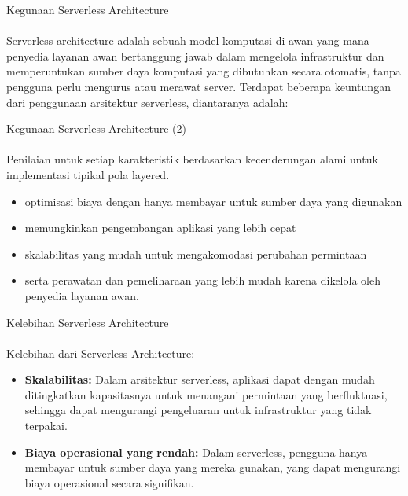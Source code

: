 \documentclass[aspectratio=169, table]{beamer}
\begin{document}
	\begin{frame}{Kegunaan Serverless Architecture}
		\framesubtitle{\hspace{1cm}}
		Serverless architecture adalah sebuah model komputasi di awan yang mana penyedia layanan awan bertanggung jawab dalam mengelola infrastruktur dan memperuntukan sumber daya komputasi yang dibutuhkan secara otomatis, tanpa pengguna perlu mengurus atau merawat server. Terdapat beberapa keuntungan dari penggunaan arsitektur serverless, diantaranya adalah:
		
	\end{frame}
	
	\begin{frame}{Kegunaan Serverless Architecture (2)}
		\framesubtitle{\hspace{1cm}}
		
		Penilaian untuk setiap karakteristik berdasarkan kecenderungan alami untuk implementasi tipikal pola layered.
		
		\begin{itemize}
			\item optimisasi biaya dengan hanya membayar untuk sumber daya yang digunakan
			\item memungkinkan pengembangan aplikasi yang lebih cepat
			\item skalabilitas yang mudah untuk mengakomodasi perubahan permintaan
			\item serta perawatan dan pemeliharaan yang lebih mudah karena dikelola oleh penyedia layanan awan.
		\end{itemize}
	\end{frame}
		
	\begin{frame}{Kelebihan Serverless Architecture}
		\framesubtitle{\hspace{1cm}}
		Kelebihan dari Serverless Architecture:
		\begin{itemize}
			\item \textbf{Skalabilitas:} Dalam arsitektur serverless, aplikasi dapat dengan mudah ditingkatkan kapasitasnya untuk menangani permintaan yang berfluktuasi, sehingga dapat mengurangi pengeluaran untuk infrastruktur yang tidak terpakai.
			\item \textbf{Biaya operasional yang rendah:} Dalam serverless, pengguna hanya membayar untuk sumber daya yang mereka gunakan, yang dapat mengurangi biaya operasional secara signifikan.
		
		\end{itemize}
	\end{frame}
	
\end{document}
